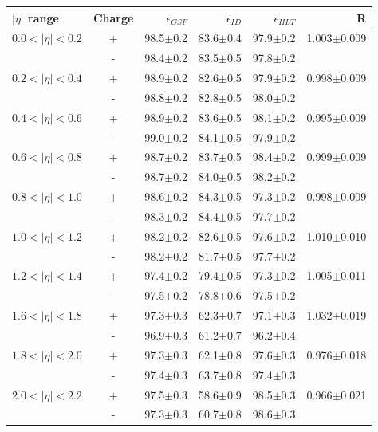 \begin{table}[htbp]
\begin{center}
\begin{tabular}{lcrrrr}
\toprule
$|\eta|$ range & Charge & $\epsilon_{GSF}$ &$\epsilon_{ID}$&$\epsilon_{HLT}$& R\\
\midrule
$0.0<| \eta |<0.2$ &+& 98.5$\pm$0.2 &83.6$\pm$0.4 &97.9$\pm$0.2 &1.003$\pm$0.009\\
                   &-& 98.4$\pm$0.2 &83.5$\pm$0.5 &97.8$\pm$0.2 & \\
$0.2<| \eta |<0.4$ &+& 98.9$\pm$0.2 &82.6$\pm$0.5 &97.9$\pm$0.2 & 0.998$\pm$0.009\\
                   &-& 98.8$\pm$0.2 &82.8$\pm$0.5 &98.0$\pm$0.2 & \\
$0.4<| \eta |<0.6$ &+& 98.9$\pm$0.2&83.6$\pm$0.5 &98.1$\pm$0.2 & 0.995$\pm$0.009\\
                   &-& 99.0$\pm$0.2 &84.1$\pm$0.5 &97.9$\pm$0.2 & \\
$0.6<| \eta |<0.8$ &+& 98.7$\pm$0.2 &83.7$\pm$0.5 &98.4$\pm$0.2 & 0.999$\pm$0.009\\
                   &-& 98.7$\pm$0.2 &84.0$\pm$0.5&98.2$\pm$0.2 & \\
$0.8<| \eta |<1.0$ &+& 98.6$\pm$0.2 &84.3$\pm$0.5 &97.3$\pm$0.2 & 0.998$\pm$0.009\\
                   &-& 98.3$\pm$0.2 &84.4$\pm$0.5 &97.7$\pm$0.2 & \\
$1.0<| \eta |<1.2$ &+& 98.2$\pm$0.2 &82.6$\pm$0.5 &97.6$\pm$0.2 & 1.010$\pm$0.010\\
                   &-& 98.2$\pm$0.2 &81.7$\pm$0.5 &97.7$\pm$0.2 & \\
$1.2<| \eta |<1.4$ &+& 97.4$\pm$0.2 &79.4$\pm$0.5 &97.3$\pm$0.2 & 1.005$\pm$0.011\\
                   &-& 97.5$\pm$0.2 &78.8$\pm$0.6 &97.5$\pm$0.2 & \\
$1.6<| \eta |<1.8$ &+& 97.3$\pm$0.3 &62.3$\pm$0.7 &97.1$\pm$0.3 & 1.032$\pm$0.019\\
                   &-& 96.9$\pm$0.3 &61.2$\pm$0.7 &96.2$\pm$0.4 & \\
$1.8<| \eta |<2.0$ &+& 97.3$\pm$0.3 &62.1$\pm$0.8 &97.6$\pm$0.3 & 0.976$\pm$0.018\\
                   &-& 97.4$\pm$0.3 &63.7$\pm$0.8 &97.4$\pm$0.3 & \\
$2.0<| \eta |<2.2$ &+& 97.5$\pm$0.3 &58.6$\pm$0.9 &98.5$\pm$0.3 & 0.966$\pm$0.021\\
                   &-& 97.3$\pm$0.3 &60.7$\pm$0.8 &98.6$\pm$0.3 & \\

\end{tabular}
\end{center}
\end{table}
